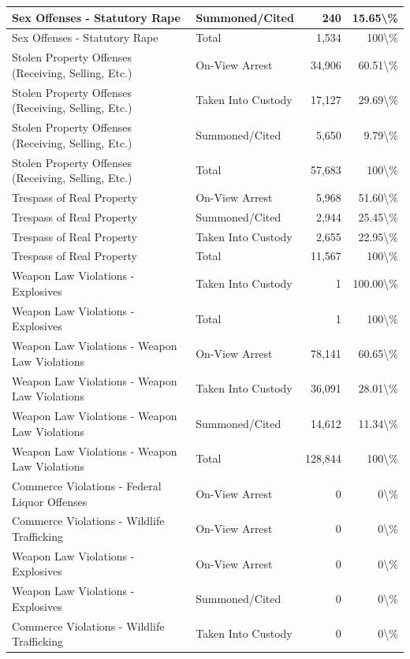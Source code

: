 \documentclass[
]{krantz}
\begin{document}
\begin{longtable}[t]{l|l|r|r}
\hline
Sex Offenses - Statutory Rape & Summoned/Cited & 240 & 15.65\textbackslash{}\%\\
\hline
Sex Offenses - Statutory Rape & Total & 1,534 & 100\textbackslash{}\%\\
\hline
Stolen Property Offenses (Receiving, Selling, Etc.) & On-View Arrest & 34,906 & 60.51\textbackslash{}\%\\
\hline
Stolen Property Offenses (Receiving, Selling, Etc.) & Taken Into Custody & 17,127 & 29.69\textbackslash{}\%\\
\hline
Stolen Property Offenses (Receiving, Selling, Etc.) & Summoned/Cited & 5,650 & 9.79\textbackslash{}\%\\
\hline
Stolen Property Offenses (Receiving, Selling, Etc.) & Total & 57,683 & 100\textbackslash{}\%\\
\hline
Trespass of Real Property & On-View Arrest & 5,968 & 51.60\textbackslash{}\%\\
\hline
Trespass of Real Property & Summoned/Cited & 2,944 & 25.45\textbackslash{}\%\\
\hline
Trespass of Real Property & Taken Into Custody & 2,655 & 22.95\textbackslash{}\%\\
\hline
Trespass of Real Property & Total & 11,567 & 100\textbackslash{}\%\\
\hline
Weapon Law Violations - Explosives & Taken Into Custody & 1 & 100.00\textbackslash{}\%\\
\hline
Weapon Law Violations - Explosives & Total & 1 & 100\textbackslash{}\%\\
\hline
Weapon Law Violations - Weapon Law Violations & On-View Arrest & 78,141 & 60.65\textbackslash{}\%\\
\hline
Weapon Law Violations - Weapon Law Violations & Taken Into Custody & 36,091 & 28.01\textbackslash{}\%\\
\hline
Weapon Law Violations - Weapon Law Violations & Summoned/Cited & 14,612 & 11.34\textbackslash{}\%\\
\hline
Weapon Law Violations - Weapon Law Violations & Total & 128,844 & 100\textbackslash{}\%\\
\hline
Commerce Violations - Federal Liquor Offenses & On-View Arrest & 0 & 0\textbackslash{}\%\\
\hline
Commerce Violations - Wildlife Trafficking & On-View Arrest & 0 & 0\textbackslash{}\%\\
\hline
Weapon Law Violations - Explosives & On-View Arrest & 0 & 0\textbackslash{}\%\\
\hline
Weapon Law Violations - Explosives & Summoned/Cited & 0 & 0\textbackslash{}\%\\
\hline
Commerce Violations - Wildlife Trafficking & Taken Into Custody & 0 & 0\textbackslash{}\%\\
\hline
\end{longtable}
\end{document}
